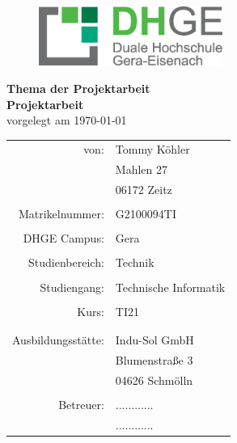 \thispagestyle{empty}

\begin{figure}
\begin{center}
	\includegraphics[width=6cm]{DHGE_Logo.eps}
	\vspace*{1,5cm}
	
\end{center}
\end{figure}

\begin{center}

	{\LARGE \textbf{Thema der Projektarbeit}}\\
	\vspace{1,5cm}				%
	{\Huge \textbf{Projektarbeit}}\\
	\vspace{1.0cm}
	vorgelegt am \today\\
	\vspace{2.0cm}
	
\begin{tabular}{rl}
	von:				& Tommy Köhler\\
						& Mahlen 27\\
						& 06172 Zeitz\\
						& \\
	Matrikelnummer: 	& G2100094TI\\
						& \\
	DHGE Campus:		& Gera\\
						& \\
	Studienbereich:		& Technik\\
						& \\
	Studiengang:		& Technische Informatik\\
						& \\
	Kurs:				& TI21\\
						& \\
						& \\
	Ausbildungsstätte:	& Indu-Sol GmbH\\
						& Blumenstraße 3\\
						& 04626 Schmölln\\
						& \\
	Betreuer:			& ............ \\
						& ............ \\
						
						
\end{tabular}
\end{center}